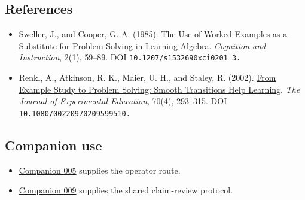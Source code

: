 \documentclass[
  11pt,
]{article}
\providecommand{\tightlist}{%
  \setlength{\itemsep}{0pt}\setlength{\parskip}{0pt}}
\begin{document}
\subsection{References}\label{references}

\begin{itemize}
\tightlist
\item
  Sweller, J., and Cooper, G. A. (1985).
  \href{https://doi.org/10.1207/s1532690xci0201_3}{The Use of Worked
  Examples as a Substitute for Problem Solving in Learning Algebra}.
  \emph{Cognition and Instruction}, 2(1), 59--89. DOI
  \nolinkurl{10.1207/s1532690xci0201_3.}
\item
  Renkl, A., Atkinson, R. K., Maier, U. H., and Staley, R. (2002).
  \href{https://doi.org/10.1080/00220970209599510}{From Example Study to
  Problem Solving: Smooth Transitions Help Learning}. \emph{The Journal
  of Experimental Education}, 70(4), 293--315. DOI
  \nolinkurl{10.1080/00220970209599510.}
\end{itemize}

\subsection{Companion use}\label{companion-use}

\begin{itemize}
\tightlist
\item
  \href{../005/paper.pdf}{Companion 005} supplies the operator route.
\item
  \href{../009/paper.pdf}{Companion 009} supplies the shared
  claim-review protocol.
\end{itemize}
\end{document}

